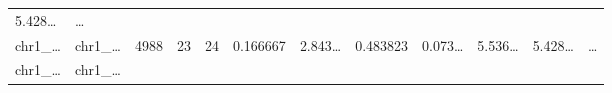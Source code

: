 \documentclass[
]{article}
\begin{document}
\begin{longtable}[]{@{}llllllllllll@{}}
\begin{minipage}[t]{0.06\columnwidth}
5.428\ldots{}\strut
\end{minipage} & \begin{minipage}[t]{0.02\columnwidth}\raggedright
\ldots{}\strut
\end{minipage}\tabularnewline
\begin{minipage}[t]{0.06\columnwidth}\raggedright
chr1\_\ldots{}\strut
\end{minipage} & \begin{minipage}[t]{0.06\columnwidth}\raggedright
chr1\_\ldots{}\strut
\end{minipage} & \begin{minipage}[t]{0.06\columnwidth}\raggedright
4988\strut
\end{minipage} & \begin{minipage}[t]{0.06\columnwidth}\raggedright
23\strut
\end{minipage} & \begin{minipage}[t]{0.06\columnwidth}\raggedright
24\strut
\end{minipage} & \begin{minipage}[t]{0.06\columnwidth}\raggedright
0.166667\strut
\end{minipage} & \begin{minipage}[t]{0.08\columnwidth}\raggedright
2.843\ldots{}\strut
\end{minipage} & \begin{minipage}[t]{0.06\columnwidth}\raggedright
0.483823\strut
\end{minipage} & \begin{minipage}[t]{0.06\columnwidth}\raggedright
0.073\ldots{}\strut
\end{minipage} & \begin{minipage}[t]{0.09\columnwidth}\raggedright
5.536\ldots{}\strut
\end{minipage} & \begin{minipage}[t]{0.06\columnwidth}\raggedright
5.428\ldots{}\strut
\end{minipage} & \begin{minipage}[t]{0.02\columnwidth}\raggedright
\ldots{}\strut
\end{minipage}\tabularnewline
\begin{minipage}[t]{0.06\columnwidth}\raggedright
chr1\_\ldots{}\strut
\end{minipage} & \begin{minipage}[t]{0.06\columnwidth}\raggedright
chr1\_\ldots{}\strut
\end{minipage} & \begin{minipage}[t]{0.06\columnwidth}\raggedright

\end{minipage}
\end{longtable}
\end{document}

